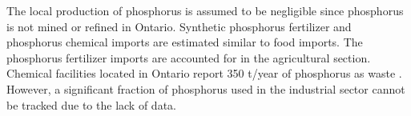 \documentclass[]{elsarticle}
\begin{document}
The local production of phosphorus is assumed to be negligible since phosphorus is not mined or refined in Ontario. Synthetic phosphorus fertilizer and phosphorus chemical imports are estimated similar to food imports.  The phosphorus fertilizer imports are accounted for in the agricultural section. Chemical facilities located in Ontario report 350 t/year of phosphorus as waste \citep{PFlows_Ontario}.
However,
a significant fraction of phosphorus used in the industrial sector cannot be tracked due to the lack of data.
\end{document}
